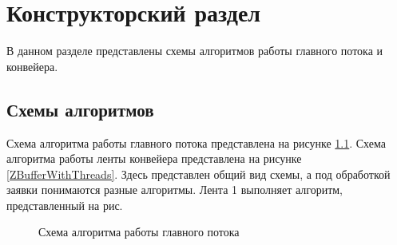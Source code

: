 \chapter{Конструкторский раздел}
В данном разделе представлены схемы алгоритмов работы главного потока и конвейера.

\section{Схемы алгоритмов}
Схема алгоритма работы главного потока представлена  на рисунке \ref{ZBufferAlg}.
Схема алгоритма работы ленты конвейера представлена  на рисунке \ref{ZBufferWithThreads}. Здесь представлен общий вид схемы, а под обработкой заявки понимаются разные алгоритмы. Лента 1 выполняет алгоритм, представленный на рис. %

\begin{figure}
	\caption{Схема алгоритма работы главного потока}
	\label{ZBufferAlg}
\end{figure}

